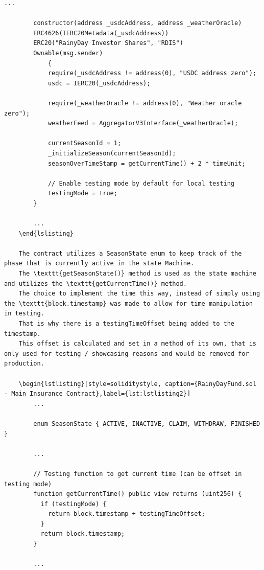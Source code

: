 \documentclass[11pt,a4paper]{article}
\begin{document}
    \begin{lstlisting}[style=soliditystyle, caption={RainyDayFund.sol - Main Insurance Contract},label={lst:lstlisting1}]
        ...

        constructor(address _usdcAddress, address _weatherOracle)
        ERC4626(IERC20Metadata(_usdcAddress))
        ERC20("RainyDay Investor Shares", "RDIS")
        Ownable(msg.sender)
            {
            require(_usdcAddress != address(0), "USDC address zero");
            usdc = IERC20(_usdcAddress);

            require(_weatherOracle != address(0), "Weather oracle zero");
            weatherFeed = AggregatorV3Interface(_weatherOracle);

            currentSeasonId = 1;
            _initializeSeason(currentSeasonId);
            seasonOverTimeStamp = getCurrentTime() + 2 * timeUnit;

            // Enable testing mode by default for local testing
            testingMode = true;
        }

        ...
    \end{lslisting}

    The contract utilizes a SeasonState enum to keep track of the phase that is currently active in the state Machine.
    The \texttt{getSeasonState()} method is used as the state machine and utilizes the \texttt{getCurrentTime()} method.
    The choice to implement the time this way, instead of simply using the \texttt{block.timestamp} was made to allow for time manipulation in testing.
    That is why there is a testingTimeOffset being added to the timestamp.
    This offset is calculated and set in a method of its own, that is only used for testing / showcasing reasons and would be removed for production.

    \begin{lstlisting}[style=soliditystyle, caption={RainyDayFund.sol - Main Insurance Contract},label={lst:lstlisting2}]
        ...

        enum SeasonState { ACTIVE, INACTIVE, CLAIM, WITHDRAW, FINISHED }

        ...

        // Testing function to get current time (can be offset in testing mode)
        function getCurrentTime() public view returns (uint256) {
          if (testingMode) {
            return block.timestamp + testingTimeOffset;
          }
          return block.timestamp;
        }

        ...


\end{lstlisting}
\end{document}
